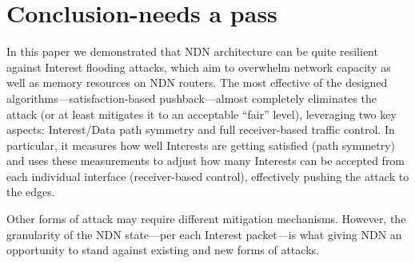 \section{Conclusion{\color{red}-needs a pass}}
\label{sec:conclusion}





In this paper we demonstrated that NDN architecture can be quite resilient against Interest flooding attacks, which aim to overwhelm network capacity as well as memory resources on NDN routers.
The most effective of the designed algorithms---satisfaction-based pushback---almost completely eliminates the attack (or at least mitigates it to an acceptable ``fair'' level), leveraging two key aspects: Interest/Data path symmetry and full receiver-based traffic control.
In particular, it measures how well Interests are getting satisfied (path symmetry) and uses these measurements to adjust how many Interests can be accepted from each individual interface (receiver-based control), effectively pushing the attack to the edges.

Other forms of attack may require different mitigation mechanisms.  
However, the granularity of the NDN state---per each Interest packet---is what giving NDN an opportunity to stand against existing and new forms of attacks.




